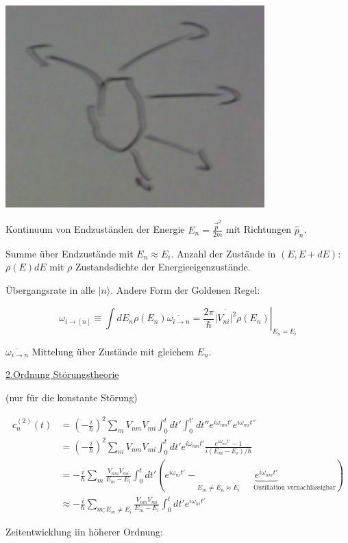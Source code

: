 \includegraphics[width=0.75\textwidth]{kap03_08.png}

Kontinuum von Endzuständen der Energie \(E_n = \frac{\vec p^2}{2m}\) mit Richtungen \(\hat p_n\).

Summe über Endzustände mit \(E_n \approx E_i\). Anzahl der Zustände in \((E,E+dE)\): \(\rho(E)dE\) mit \(\rho\) Zustandsdichte der Energieeigenzustände.

Übergangsrate in alle \(|n\rangle \). Andere Form der Goldenen Regel:

\[\boxed{\omega_{i\rightarrow [n]} \equiv \int dE_n\rho(E_n)\overline{\omega_{i\rightarrow n}} = \left. \frac{2\pi}{\hbar}\overline{|V_{ni}|^2}\rho(E_n)\right|_{E_n=E_i}}\]

\(\overline{\omega_{i\rightarrow n}}\) Mittelung über Zustände mit gleichem \(E_n\).

\underline{2.Ordnung Störungstheorie}

(nur für die konstante Störung)

\begin{align}
  c^{(2)}_n(t) &= (-\frac{i}{\hbar})^2 \sum_m V_{nm}V_{mi} \int_0^t dt'\int_0^{t'} dt''e^{i\omega_{nm}t'}e^{i\omega_{mi}t''}\\
  &= (-\frac{i}{\hbar})^2 \sum_m V_{nm}V_{mi} \int_0^t dt' e^{i\omega_{nm}t'} \frac{e^{i\omega_{mi}t'}-1}{i(E_m-E_i)/\hbar}\\
  &= -\frac{i}{\hbar}\sum_m \frac{ V_{nm}V_{mi} }{E_m-E_i} \int_0^t dt' (e^{i\omega_{ni}t'}-\underbrace{e^{i\omega_{nm}t'}}_{E_m\neq E_n\approx E_i\qquad\text{Oszillation vernachlässigbar}})\\
  &\approx -\frac{i}{\hbar}\sum_{m; E_m\neq E_i} \frac{ V_{nm}V_{mi} }{E_m-E_i} \int_0^t dt'e^{i\omega_{ni}t'}
\end{align}


Zeitentwicklung iin höherer Ordnung:

